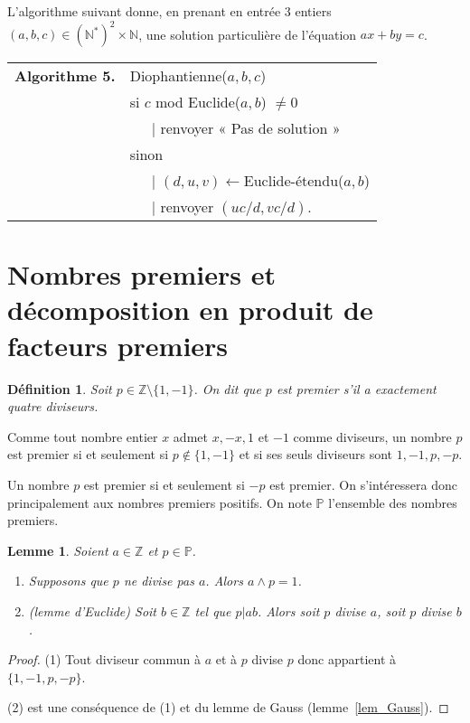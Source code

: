 \documentclass[12pt]{report}
\newtheorem{Def}[thm]{Définition}
\newtheorem{Lem}[thm]{Lemme}
\newcommand{\Z}{\mathbb{Z}}
\begin{document}
L'algorithme suivant donne, en prenant en entrée 3 entiers $(a,b,c)\in (\mathbb{N}^*)^2 \times \mathbb{N}$, une solution particulière de l'équation $ax+by=c$.

\begin{tabular}{ll}
\textbf{Algorithme 5.} & Diophantienne($a,b,c$)\\
& si $c$ mod Euclide($a,b$) $\neq 0 $ \\
& \ \ \ {\rm |} renvoyer « Pas de solution »  \\
& sinon \\
& \ \ \ {\rm | }  $(d,u,v)  \leftarrow $Euclide-étendu($a,b$) \\
& \ \ \ {\rm |} renvoyer $(uc/d,vc/d)$. 
\end{tabular}



\section{Nombres premiers et décomposition en produit de facteurs premiers}

\begin{Def}
Soit $p\in \Z\setminus \{1,-1\}$. On dit que $p$ est premier s'il a exactement quatre diviseurs. 
\end{Def}

Comme tout nombre entier $x$ admet $x,-x, 1$ et $-1$ comme diviseurs, un nombre $p$ est premier si et seulement si $p\notin \{1,-1\}$ et si ses seuls diviseurs sont $1,-1,p,-p$.

Un nombre $p$ est premier si et seulement si $-p$ est premier. On s'intéressera donc principalement aux nombres premiers positifs. On note $\mathbb{P}$ l'ensemble des nombres premiers.
 
\begin{Lem}\label{lem_Euclide}
Soient $a\in \Z$ et $p\in \mathbb{P}$. \begin{enumerate}
\item Supposons que $p$ ne divise pas $a$. Alors $a\wedge p=1$.

\item (lemme d'Euclide) Soit $b\in \Z$ tel que $p|ab$. Alors soit $p$ divise $a$, soit $p$ divise $b$.
\end{enumerate} 

\end{Lem}

\begin{proof}
(1) Tout diviseur commun à $a$ et à $p$ divise $p$ donc appartient à $\{1,-1,p,-p\}$.  

(2) est une conséquence de (1) et du lemme de Gauss (lemme~\ref{lem_Gauss}).
\end{proof}
\end{document}
